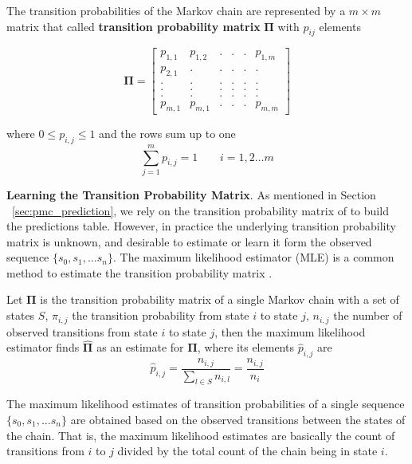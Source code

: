 The transition probabilities of the Markov chain are represented by a $m \times m$ matrix that called \textbf{transition probability matrix} $\boldsymbol{\Pi}$ with $p_{ij}$ elements


\begin{equation}
\label{eq:matrix_example}
\boldsymbol{\Pi} = 
\begin{bmatrix} 
p_{1,1}	   &p_{1,2}  &. 		&. 		& . &  	p_{1,m} \\
p_{2,1}		   &.  & .		& .	    & .	& . \\
. 		   &.  & .		& .	    & .	& . \\
.		   &.  & .		& .		& .	& . \\
.		   &.  & .		& .		& .	& .\\
p_{m,1}	   & p_{m,1}	&.		& .	& .	&p_{m,m}
\end{bmatrix}
\end{equation}

where $0 \leq p_{i,j}\leq 1 $ and the rows sum up to one 
\begin{equation}
\sum_{j=1}^{m} p_{i,j}= 1\ \ \ \ \ \ \ \ \ i=1,2 \ldots m
\end{equation}

\textbf{Learning the Transition Probability Matrix}. As mentioned in Section ~\ref{sec:pmc_prediction}, we rely on the transition probability matrix of \pmcmr to build the predictions table. However, in practice the underlying  transition probability matrix is unknown, and desirable to estimate or learn it form the observed sequence $\{s_0, s_1, \ldots s_n\}$. The maximum likelihood estimator (MLE) is a common method to estimate the transition probability matrix \cite{anderson1957statistical}.


\begin{definition}
	Let $\boldsymbol{\Pi}$ is the transition probability matrix of a single Markov chain with a set of states $S$, 
	$\pi_{i,j}$ the transition probability from state $i$ to state $j$,
	$n_{i,j}$ the number of observed transitions from state $i$ to state $j$,
	then the maximum likelihood estimator finds $\boldsymbol{\hat{\Pi}}$ as an estimate for $\boldsymbol{\Pi}$, where its elements $\hat{p}_{i,j}$ are
	\begin{equation}
	\label{eq:pi_estim}
	\hat{p}_{i,j}=\frac{n_{i,j}}{\sum_{l \in S} n_{i,l}}=\frac{n_{i,j}}{n_{i}}
	\end{equation}
	
\end{definition} 


	The maximum likelihood estimates of transition probabilities of a single sequence $\{s_0, s_1, \ldots s_n\}$   are obtained based on the observed transitions between the states of the chain. That is, the maximum likelihood estimates are basically the count of transitions from $i$ to $j$ divided by the total count of the chain being in state $i$.  
	
